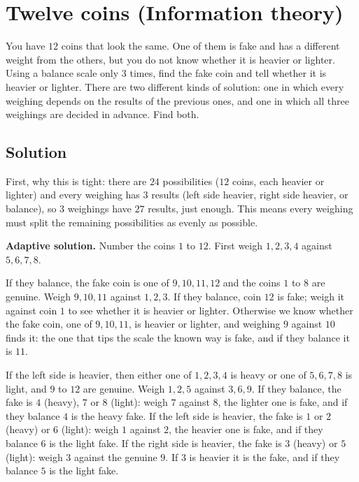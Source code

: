 \section {Twelve coins (Information theory)}

You have $12$ coins that look the same. One of them is fake and has a different weight from the others, but you do not know whether it is heavier or lighter.
Using a balance scale only $3$ times, find the fake coin and tell whether it is heavier or lighter.
There are two different kinds of solution: one in which every weighing depends on the results of the previous ones,
and one in which all three weighings are decided in advance. Find both.

\subsection{Solution}

First, why this is tight: there are $24$ possibilities ($12$ coins, each heavier or lighter) and every weighing has $3$ results
(left side heavier, right side heavier, or balance), so $3$ weighings have $27$ results, just enough.
This means every weighing must split the remaining possibilities as evenly as possible.

\textbf{Adaptive solution.} Number the coins $1$ to $12$. First weigh $1,2,3,4$ against $5,6,7,8$.

If they balance, the fake coin is one of $9,10,11,12$ and the coins $1$ to $8$ are genuine.
Weigh $9,10,11$ against $1,2,3$.
If they balance, coin $12$ is fake; weigh it against coin $1$ to see whether it is heavier or lighter.
Otherwise we know whether the fake coin, one of $9,10,11$, is heavier or lighter, and weighing $9$ against $10$ finds it:
the one that tips the scale the known way is fake, and if they balance it is $11$.

If the left side is heavier, then either one of $1,2,3,4$ is heavy or one of $5,6,7,8$ is light, and $9$ to $12$ are genuine.
Weigh $1,2,5$ against $3,6,9$.
If they balance, the fake is $4$ (heavy), $7$ or $8$ (light): weigh $7$ against $8$, the lighter one is fake, and if they balance $4$ is the heavy fake.
If the left side is heavier, the fake is $1$ or $2$ (heavy) or $6$ (light): weigh $1$ against $2$, the heavier one is fake, and if they balance $6$ is the light fake.
If the right side is heavier, the fake is $3$ (heavy) or $5$ (light): weigh $3$ against the genuine $9$. If $3$ is heavier it is the fake, and if they balance $5$ is the light fake.

